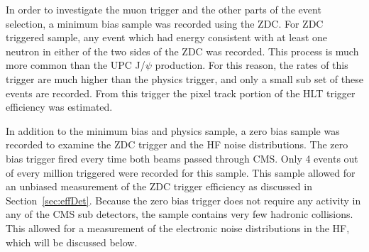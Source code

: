       In order to investigate the muon trigger and the other parts of the event 
        selection, a minimum bias sample was recorded using the ZDC. 
      For ZDC triggered sample, any event which had energy consistent with at 
        least one neutron in either of the two sides of the ZDC was recorded.
      This process is much more common than the UPC J/$\psi$ production.
      For this reason, the rates of this trigger are much higher than the physics
        trigger, and only a small sub set of these events are recorded.
      From this trigger the pixel track portion of the HLT trigger efficiency 
        was estimated. 

      In addition to the minimum bias and physics sample, a zero bias sample was 
        recorded to examine the ZDC trigger and the HF noise distributions. 
      The zero bias trigger fired every time both beams passed through CMS. 
      Only 4 events out of every million triggered were recorded for this sample. 
      This sample allowed for an unbiased measurement of the ZDC trigger 
      efficiency as discussed in Section~\ref{sec:effDet}. 
      Because the zero bias trigger does not require any activity in any of the
        CMS sub detectors, the sample contains very few hadronic collisions. 
      This allowed for a measurement of the electronic noise distributions in
      the HF, which will be discussed below.

